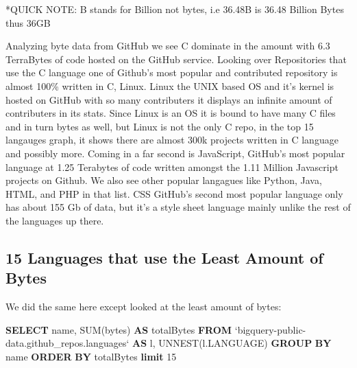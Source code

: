 \documentclass[11pt]{article}
\newenvironment{Shaded}{}{}
\newcommand{\KeywordTok}[1]{\textcolor[rgb]{0.00,0.44,0.13}{\textbf{{#1}}}}
\newcommand{\DecValTok}[1]{\textcolor[rgb]{0.25,0.63,0.44}{{#1}}}
\newcommand{\FunctionTok}[1]{\textcolor[rgb]{0.02,0.16,0.49}{{#1}}}
\newcommand{\NormalTok}[1]{{#1}}
\begin{document}
    *QUICK NOTE: B stands for Billion not bytes, i.e 36.48B is 36.48 Billion
Bytes thus 36GB

    Analyzing byte data from GitHub we see C dominate in the amount with 6.3
TerraBytes of code hosted on the GitHub service. Looking over
Repositories that use the C language one of Github's most popular and
contributed repository is almost 100\% written in C, Linux. Linux the
UNIX based OS and it's kernel is hosted on GitHub with so many
contributers it displays an infinite amount of contributers in its
stats. Since Linux is an OS it is bound to have many C files and in turn
bytes as well, but Linux is not the only C repo, in the top 15 langauges
graph, it shows there are almost 300k projects written in C language and
possibly more. Coming in a far second is JavaScript, GitHub's most
popular language at 1.25 Terabytes of code written amongst the 1.11
Million Javascript projects on Github. We also see other popular
langagues like Python, Java, HTML, and PHP in that list. CSS GitHub's
second most popular language only has about 155 Gb of data, but it's a
style sheet language mainly unlike the rest of the languages up there.

    \hypertarget{languages-that-use-the-least-amount-of-bytes}{%
\subsection{15 Languages that use the Least Amount of
Bytes}\label{languages-that-use-the-least-amount-of-bytes}}

    We did the same here except looked at the least amount of bytes:

\begin{Shaded}
\begin{Highlighting}[]
\KeywordTok{SELECT}
\NormalTok{  name,}
  \FunctionTok{SUM}\NormalTok{(bytes) }\KeywordTok{AS}\NormalTok{ totalBytes}
\KeywordTok{FROM}
\NormalTok{  `bigquery-public-data.github_repos.languages` }\KeywordTok{AS}\NormalTok{ l,}
\NormalTok{  UNNEST(l.LANGUAGE)}
\KeywordTok{GROUP} \KeywordTok{BY}
\NormalTok{  name}
\KeywordTok{ORDER} \KeywordTok{BY}
\NormalTok{  totalBytes}
\KeywordTok{limit} \DecValTok{15}
\end{Highlighting}
\end{Shaded}
\end{document}

